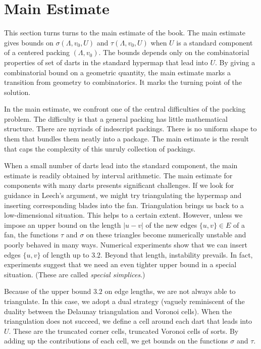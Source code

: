 \section{Main Estimate} %
    \label{sec:the-main-theorem}

This section turns turns to the main estimate of the book.
The main estimate gives bounds on $\sigma(\Lambda,v_0,U)$ and
$\tau(\Lambda,v_0,U)$ when $U$ is a standard component of 
a centered packing $(\Lambda,v_0)$.  The bounds depends only
on the combinatorial properties of set of darts in the standard
hypermap that lead into $U$.  By giving a combinatorial bound
on a geometric quantity, the main estimate 
marks a transition from geometry to combinatorics.  It
marks the turning point of the solution.

In the main estimate, we confront one of the central difficulties of
the packing problem.  The difficulty is that a general
packing has little mathematical structure.  There
are myriads of indescript packings.  There is no uniform
shape to them that bundles them neatly into a package.  The
main estimate is the result that
caps the complexity of this unruly collection
of packings.

When a small number of darts lead into the standard component,
the main estimate is readily obtained by interval arithmetic.  The
main estimate for components with many darts presents significant
challenges.  If we look for guidance in Leech's argument,
we might try triangulating the hypermap and inserting corresponding
blades into the fan.  Triangulation brings us back to a low-dimensional
situation.  This helps to a certain extent.  However, unless
we impose an upper bound on the length $|u-v|$ of
the new edges $\{u,v\}\in E$ of a fan, the
functions $\tau$ and $\sigma$ on these triangles become numerically
unstable and poorly behaved in many ways. 
Numerical experiments show
that we can insert edges $\{u,v\}$ of length up to $3.2$.  Beyond that
length, instability prevails.
In fact, experiments suggest that
we need an even tighter upper bound in a special situation.  (These
are called {\it special simplices}.)

Because of the upper bound $3.2$ on edge lengths, we are not always
able to triangulate.  In this case, we adopt a dual strategy (vaguely
reminiscent of the duality between the Delaunay triangulation and
Voronoi cells).  When the triangulation does not succeed, we define
a cell around each dart that leads into $U$.  These are the truncated
corner cells, truncated Voronoi cells of sorts.  By adding up the 
contributions of each cell, we get bounds on the functions $\sigma$ and
$\tau$.

